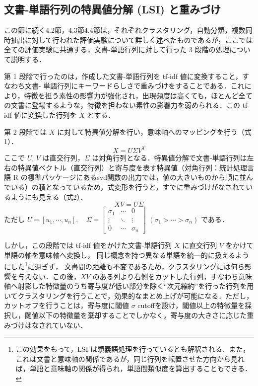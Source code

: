 \documentclass[japanese]{jnlp_1.4}
\begin{document}
\subsection{文書‐単語行列の特異値分解 (LSI) と重みづけ}

この節に続く4.2節，4.3節4.4節は，それぞれクラスタリング，自動分類，複数同時抽出に対して行われた評価実験について詳しく述べたものであるが，ここでは全ての評価実験に共通する，文書‐単語行列に対して行った 3 段階の処理について説明する．

第 1 段階で行ったのは，作成した文書‐単語行列を tf-idf 値に変換すること，すなわち文書‐
\linebreak
単語行列にキーワードらしさで重みづけをすることである．これにより，特徴を担う素性の影響力が強化され，出現頻度は高くても，ほとんど全ての文書に登場するような，特徴を担わない素性の影響力を弱められる．この tf-idf 値に変換した行列を $X$ とする．

第 2 段階では $X$ に対して特異値分解を行い，意味軸へのマッピングを行う（式 1）．
\begin{equation}
 X=U\Sigma V^{T}
	
\end{equation}
ここで $U$, $V$ は直交行列，$\Sigma$ は対角行列となる．特異値分解で文書‐単語行列は左右の特異値ベクトル（直交行列）と寄与度を表す特異値（対角行列：統計処理言語 R の標準パッケージにあるsvd関数の出力では，値の大きいものから順に並んでいる）の積となっているため，式変形を行うと，すでに重みづけがなされているようにも見える（式2）．
\begin{equation}
XV=U\Sigma
	
\end{equation}
ただし $ U=[u_{1}, \cdots, u_{n}], 
 \quad \Sigma=\begin{bmatrix}
  \sigma_{1} & \cdots & 0 \\
  \vdots & \ddots & \vdots \\
  0 & \cdots & \sigma_{n}
  \end{bmatrix}$
 \quad $(\sigma_{1}> \cdots > \sigma_{n})$ である．
\vspace{0.5\Cvs}

しかし，この段階では tf-idf 値をかけた文書‐単語行列 $X$ に直交行列 $V$ をかけて単語の軸を意味軸へ変換し，
同じ概念を持つ異なる単語を統一的に扱えるようにした\footnote{この効果をもって，LSI は類義語処理を行っているとも解釈される．また，これは文書と意味軸の関係であるが，同じ行列を転置させた方向から見れば，単語と意味軸の関係が得られ，単語間類似度を算出することもできる．}に過ぎず，
文書間の距離も不変であるため，クラスタリングには何ら影響を与えない．この後，$XV$ のある列より右側をカットした行列，すなわち意味軸へ射影した特徴量のうち寄与度が低い部分を除く``次元縮約''を行った行列を用いてクラスタリングを行うことで，効果的なまとめ上げが可能になる．ただし，カットオフを行うことは，寄与度に閾値 $\sigma$ cutoffを設け，閾値以上の特徴量を採択し，閾値以下の特徴量を棄却することでしかなく，寄与度の大きさに応じた重みづけはなされていない．
\end{document}
